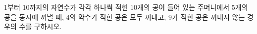 1부터 10까지의 자연수가 각각 하나씩 적힌 10개의 공이 들어 있는 주머니에서 5개의 공을 동시에 꺼낼 때, 4의 약수가 적힌 공은 모두 꺼내고, 9가 적힌 공은 꺼내지 않는 경우의 수를 구하시오.
